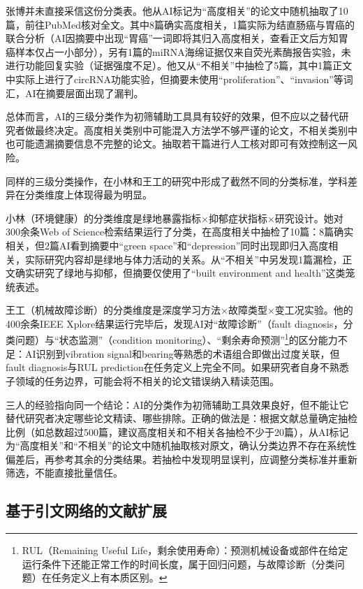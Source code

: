 \begin{critiquebox}
张博并未直接采信这份分类表。他从AI标记为``高度相关''的论文中随机抽取了10篇，前往PubMed核对全文。其中8篇确实高度相关，1篇实际为结直肠癌与胃癌的联合分析（AI因摘要中出现``胃癌''一词即将其归入高度相关，查看正文后方知胃癌样本仅占一小部分），另有1篇的miRNA海绵证据仅来自荧光素酶报告实验，未进行功能回复实验（证据强度不足）。他又从``不相关''中抽检了5篇，其中1篇正文中实际上进行了circRNA功能实验，但摘要未使用``proliferation''、``invasion''等词汇，AI在摘要层面出现了漏判。

总体而言，AI的三级分类作为初筛辅助工具具有较好的效果，但不应以之替代研究者做最终决定。高度相关类别中可能混入方法学不够严谨的论文，不相关类别中也可能遗漏摘要信息不完整的论文。抽取若干篇进行人工核对即可有效控制这一风险。
\end{critiquebox}

\smallskip
同样的三级分类操作，在小林和王工的研究中形成了截然不同的分类标准，学科差异在分类维度上体现得最为明显。

小林（环境健康）的分类维度是绿地暴露指标×抑郁症状指标×研究设计。她对300余条Web of Science检索结果运行了分类，在高度相关中抽检了10篇：8篇确实相关，但2篇AI看到摘要中``green space''和``depression''同时出现即归入高度相关，实际研究内容却是绿地与体力活动的关系。从``不相关''中另发现1篇漏检，正文确实研究了绿地与抑郁，但摘要仅使用了``built environment and health''这类笼统表述。

王工（机械故障诊断）的分类维度是深度学习方法×故障类型×变工况实验。他的400余条IEEE Xplore结果运行完毕后，发现AI对``故障诊断''（fault diagnosis，分类问题）与``状态监测''（condition monitoring）、``剩余寿命预测''\footnote{RUL（Remaining Useful Life，剩余使用寿命）：预测机械设备或部件在给定运行条件下还能正常工作的时间长度，属于回归问题，与故障诊断（分类问题）在任务定义上有本质区别。}的区分能力不足：AI识别到vibration signal和bearing等熟悉的术语组合即做出过度关联，但fault diagnosis与RUL prediction在任务定义上完全不同。如果研究者自身不熟悉子领域的任务边界，可能会将不相关的论文错误纳入精读范围。

三人的经验指向同一个结论：AI的分类作为初筛辅助工具效果良好，但不能让它替代研究者决定哪些论文精读、哪些排除。正确的做法是：根据文献总量确定抽检比例（如总数超过500篇，建议高度相关和不相关各抽检不少于20篇），从AI标记为``高度相关''和``不相关''的论文中随机抽取核对原文，确认分类边界不存在系统性偏差后，再参考其余的分类结果。若抽检中发现明显误判，应调整分类标准并重新筛选，不能直接批量信任。


\subsection{基于引文网络的文献扩展}

